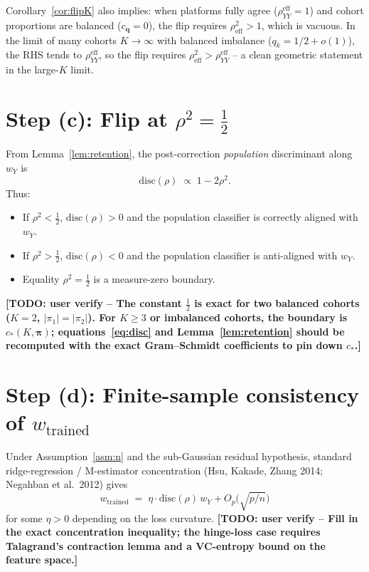 \documentclass[11pt,a4paper]{article}
\newcommand{\TODO}[1]{\textbf{[TODO: user verify -- #1]}}
\begin{document}
Corollary~\ref{cor:flipK} also implies: when platforms fully agree
($\rho_{YY}^{\!\mathrm{eff}}=1$) and cohort proportions are
balanced ($c_{\boldsymbol q}=0$), the flip requires
$\rho^{2}_{\!\mathrm{eff}}>1$, which is vacuous.  In the limit of
many cohorts $K\to\infty$ with balanced imbalance
($q_k=1/2+o(1)$), the RHS tends to $\rho_{YY}^{\!\mathrm{eff}}$, so
the flip requires $\rho^{2}_{\!\mathrm{eff}}>\rho_{YY}^{\!\mathrm{eff}}$
-- a clean geometric statement in the large-$K$ limit.

\section{Step (c): Flip at $\rho^{2}=\tfrac12$}

From Lemma~\ref{lem:retention}, the post-correction \emph{population}
discriminant along $w_Y$ is
\begin{equation}
  \mathrm{disc}(\rho) \;\propto\; 1-2\rho^{2}.
  \label{eq:disc}
\end{equation}
Thus:
\begin{itemize}
\item If $\rho^2<\tfrac12$, $\mathrm{disc}(\rho)>0$ and the population
  classifier is correctly aligned with $w_Y$.
\item If $\rho^2>\tfrac12$, $\mathrm{disc}(\rho)<0$ and the population
  classifier is anti-aligned with $w_Y$.
\item Equality $\rho^2=\tfrac12$ is a measure-zero boundary.
\end{itemize}
\TODO{The constant $\tfrac12$ is exact for two balanced cohorts
($K=2$, $|\pi_1|=|\pi_2|$). For $K\ge 3$ or imbalanced cohorts, the
boundary is $c_\ast(K,\boldsymbol{\pi})$; equations~\eqref{eq:disc} and
Lemma~\ref{lem:retention} should be recomputed with the exact
Gram--Schmidt coefficients to pin down $c_\ast$.}

\section{Step (d): Finite-sample consistency of $w_{\text{trained}}$}

Under Assumption~\ref{asm:n} and the sub-Gaussian residual hypothesis,
standard ridge-regression / M-estimator concentration (Hsu, Kakade,
Zhang 2014; Negahban et al.\ 2012) gives
\begin{equation}
  w_{\text{trained}} \;=\; \eta \cdot \mathrm{disc}(\rho)\, w_Y
    + O_{\!p}\!\bigl(\sqrt{p/n}\bigr)
\label{eq:wtr}
\end{equation}
for some $\eta>0$ depending on the loss curvature.
\TODO{Fill in the exact concentration inequality; the hinge-loss case
requires Talagrand's contraction lemma and a VC-entropy bound on the
feature space.}
\end{document}
